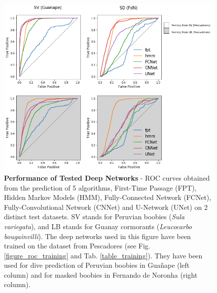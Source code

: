 \documentclass{article}
\begin{document}
\begin{figure}[!h]
  \centering
  \includegraphics[scale=0.5]{figure_roc_projection.png}
  \caption{\textbf{Performance of Tested Deep Networks} - ROC curves obtained from the prediction of 5 algorithms, First-Time Passage (FPT), Hidden Markov Models (HMM), Fully-Connected Network (FCNet), Fully-Convolutional Network (CNNet) and U-Network (UNet) on 2 distinct test datasets. SV stands for Peruvian boobies (\textit{Sula variegata}), and LB stands for Guanay cormorants (\textit{Leucocarbo bougainvilli}). The deep networks used in this figure have been trained on the dataset from Pescadores (see Fig. \ref{figure_roc_training} and Tab. \ref{table_training}). They have been used for dive prediction of Peruvian boobies in Guañape (left column) and for masked boobies in Fernando de Noronha (right column).}
  \label{figure_roc_projection}
\end{figure}
\end{document}
